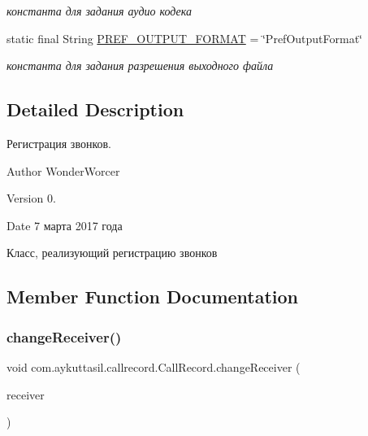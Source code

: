 \begin{DoxyCompactItemize}
\begin{DoxyCompactList}\small\item\em константа для задания аудио кодека \end{DoxyCompactList}\item 
\mbox{\label{classcom_1_1aykuttasil_1_1callrecord_1_1_call_record_a76cd4ba494164060413e68f69c137d79}} 
static final String \hyperlink{classcom_1_1aykuttasil_1_1callrecord_1_1_call_record_a76cd4ba494164060413e68f69c137d79}{P\+R\+E\+F\+\_\+\+O\+U\+T\+P\+U\+T\+\_\+\+F\+O\+R\+M\+AT} = \char`\"{}Pref\+Output\+Format\char`\"{}
\begin{DoxyCompactList}\small\item\em константа для задания разрешения выходного файла \end{DoxyCompactList}\end{DoxyCompactItemize}


\subsection{Detailed Description}
Регистрация звонков. 

\begin{DoxyAuthor}{Author}
Wonder\+Worcer 
\end{DoxyAuthor}
\begin{DoxyVersion}{Version}
0. 
\end{DoxyVersion}
\begin{DoxyDate}{Date}
7 марта 2017 года
\end{DoxyDate}
Класс, реализующий регистрацию звонков 

\subsection{Member Function Documentation}
\mbox{\label{classcom_1_1aykuttasil_1_1callrecord_1_1_call_record_a0b6b62b01721308ebcdbaf3c078aa2fa}} 
\subsubsection{\texorpdfstring{change\+Receiver()}{changeReceiver()}}
{\footnotesize\ttfamily void com.\+aykuttasil.\+callrecord.\+Call\+Record.\+change\+Receiver (\begin{DoxyParamCaption}\item[{\hyperlink{classcom_1_1aykuttasil_1_1callrecord_1_1receiver_1_1_call_record_receiver}{Call\+Record\+Receiver}}]{receiver }\end{DoxyParamCaption})}

